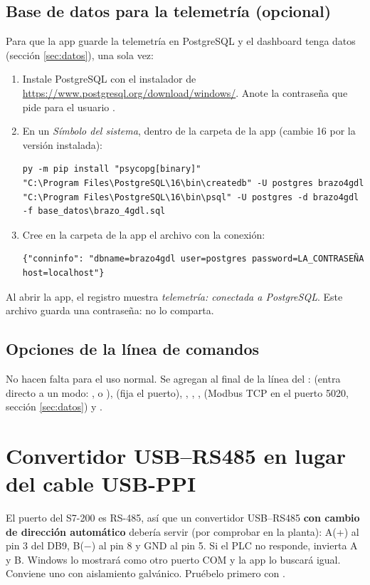 \documentclass[a4paper,11pt]{article}
\begin{document}
\subsection*{Base de datos para la telemetría (opcional)}\label{sec:postgres}
Para que la app guarde la telemetría en PostgreSQL y el dashboard tenga datos (sección \ref{sec:datos}), una sola vez:
\begin{enumerate}
\item Instale PostgreSQL con el instalador de \url{https://www.postgresql.org/download/windows/}. Anote la contraseña que pide para el usuario .
\item En un \emph{Símbolo del sistema}, dentro de la carpeta de la app (cambie 16 por la versión instalada):
\begin{lstlisting}
py -m pip install "psycopg[binary]"
"C:\Program Files\PostgreSQL\16\bin\createdb" -U postgres brazo4gdl
"C:\Program Files\PostgreSQL\16\bin\psql" -U postgres -d brazo4gdl -f base_datos\brazo_4gdl.sql
\end{lstlisting}
\item Cree en la carpeta de la app el archivo  con la conexión:
\begin{lstlisting}
{"conninfo": "dbname=brazo4gdl user=postgres password=LA_CONTRASEÑA host=localhost"}
\end{lstlisting}
\end{enumerate}
Al abrir la app, el registro muestra \emph{telemetría: conectada a PostgreSQL}. Este archivo guarda una contraseña: no lo comparta.

\subsection*{Opciones de la línea de comandos}
No hacen falta para el uso normal. Se agregan al final de la línea  del :  (entra directo a un modo: ,  o ),  (fija el puerto), , , ,  (Modbus TCP en el puerto 5020, sección \ref{sec:datos}) y .



\section{Convertidor USB--RS485 en lugar del cable USB-PPI}\label{sec:rs485}
El puerto del S7-200 es RS-485, así que un convertidor USB--RS485 \textbf{con cambio de dirección automático} debería servir (por comprobar en la planta): A(+) al pin 3 del DB9, B($-$) al pin 8 y GND al pin 5. Si el PLC no responde, invierta A y B. Windows lo mostrará como otro puerto COM y la app lo buscará igual. Conviene uno con aislamiento galvánico. Pruébelo primero con .
\end{document}
